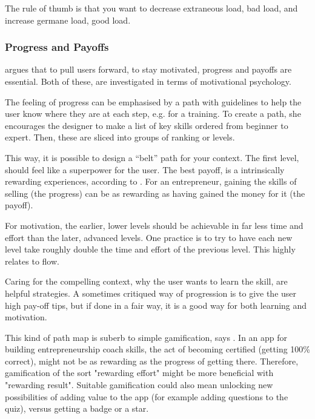 The rule of thumb is that you want to decrease extraneous load, bad load, and increase germane load, good load.

\subsubsection{Progress and Payoffs} \label{progress-payoffs}

\cite{sierra} argues that to pull users forward, to stay motivated, progress and payoffs are essential. Both of these, are investigated in terms of motivational psychology.

The feeling of progress can be emphasised by a path with guidelines to help the user know where they are at each step, e.g. for a training. To create a path, she encourages the designer to make a list of key skills ordered from beginner to expert. Then, these are sliced into groups of ranking or levels.

This way, it is possible to design a “belt” path for your context. The first level, should feel like a superpower for the user. The best payoff, is a intrinsically rewarding experiences, according to \cite{sierra}. For an entrepreneur, gaining the skills of selling (the progress) can be as rewarding as having gained the money for it (the payoff).

For motivation, the earlier, lower levels should be achievable in far less time and effort than the later, advanced levels. One practice is to try to have each new level take roughly double the time and effort of the previous level. This highly relates to flow.

Caring for the compelling context, why the user wants to learn the skill, are helpful strategies. A sometimes critiqued way of progression is to give the user high pay-off tips, but if done in a fair way, it is a good way for both learning and motivation.

This kind of path map is suberb to simple gamification, says \cite{sierra}. In an app for building entrepreneurship coach skills, the act of becoming certified (getting 100\% correct), might not be as rewarding as the progress of getting there. Therefore, gamification of the sort "rewarding effort" might be more beneficial with "rewarding result". Suitable gamification could also mean unlocking new possibilities of adding value to the app (for example adding questions to the quiz), versus getting a badge or a star.

